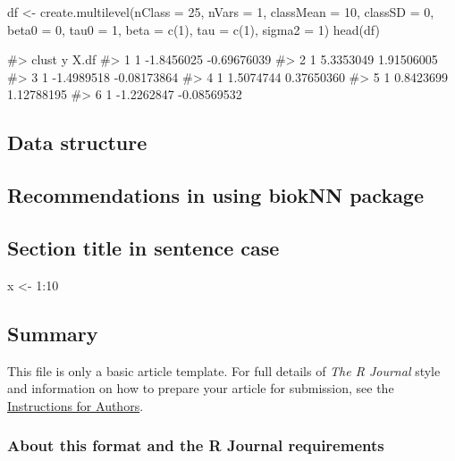 \begin{Schunk}
\begin{Sinput}
df <- create.multilevel(nClass = 25, nVars = 1, classMean = 10, classSD = 0, 
                        beta0 = 0, tau0 = 1, beta = c(1), tau = c(1), sigma2 = 1)
head(df)
\end{Sinput}
\begin{Soutput}
#>   clust          y        X.df
#> 1     1 -1.8456025 -0.69676039
#> 2     1  5.3353049  1.91506005
#> 3     1 -1.4989518 -0.08173864
#> 4     1  1.5074744  0.37650360
#> 5     1  0.8423699  1.12788195
#> 6     1 -1.2262847 -0.08569532
\end{Soutput}
\end{Schunk}

\hypertarget{data-structure}{%
\subsection{Data structure}\label{data-structure}}

\hypertarget{recommendations-in-using-bioknn-package}{%
\subsection{Recommendations in using biokNN
package}\label{recommendations-in-using-bioknn-package}}

\hypertarget{section-title-in-sentence-case}{%
\subsection{Section title in sentence
case}\label{section-title-in-sentence-case}}

\begin{Schunk}
\begin{Sinput}
x <- 1:10
\end{Sinput}
\end{Schunk}

\hypertarget{summary}{%
\subsection{Summary}\label{summary}}

This file is only a basic article template. For full details of
\emph{The R Journal} style and information on how to prepare your
article for submission, see the
\href{https://journal.r-project.org/share/author-guide.pdf}{Instructions
for Authors}.

\hypertarget{about-this-format-and-the-r-journal-requirements}{%
\subsubsection{About this format and the R Journal
requirements}\label{about-this-format-and-the-r-journal-requirements}}

